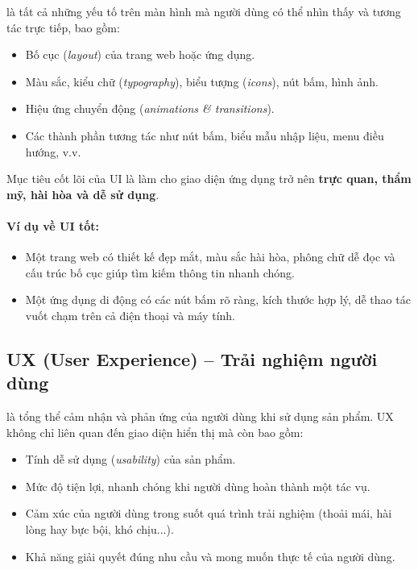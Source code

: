  là tất cả những yếu tố trên màn hình mà người dùng có thể nhìn thấy và tương tác trực tiếp, bao gồm:
\begin{itemize}[leftmargin=1.8em, itemsep=2pt, parsep=0pt]
    \item Bố cục (\textit{layout}) của trang web hoặc ứng dụng.
    \item Màu sắc, kiểu chữ (\textit{typography}), biểu tượng (\textit{icons}), nút bấm, hình ảnh.
    \item Hiệu ứng chuyển động (\textit{animations \& transitions}).
    \item Các thành phần tương tác như nút bấm, biểu mẫu nhập liệu, menu điều hướng, v.v.
\end{itemize}

\begin{tipBox}
Mục tiêu cốt lõi của UI là làm cho giao diện ứng dụng trở nên \textbf{trực quan, thẩm mỹ, hài hòa và dễ sử dụng}.
\end{tipBox}

\paragraph{Ví dụ về UI tốt:}
\begin{itemize}[leftmargin=1.8em, itemsep=2pt, parsep=0pt]
    \item Một trang web có thiết kế đẹp mắt, màu sắc hài hòa, phông chữ dễ đọc và cấu trúc bố cục giúp tìm kiếm thông tin nhanh chóng.
    \item Một ứng dụng di động có các nút bấm rõ ràng, kích thước hợp lý, dễ thao tác vuốt chạm trên cả điện thoại và máy tính.
\end{itemize}

\subsection{UX (User Experience) -- Trải nghiệm người dùng}

 là tổng thể cảm nhận và phản ứng của người dùng khi sử dụng sản phẩm. UX không chỉ liên quan đến giao diện hiển thị mà còn bao gồm:
\begin{itemize}[leftmargin=1.8em, itemsep=2pt, parsep=0pt]
    \item Tính dễ sử dụng (\textit{usability}) của sản phẩm.
    \item Mức độ tiện lợi, nhanh chóng khi người dùng hoàn thành một tác vụ.
    \item Cảm xúc của người dùng trong suốt quá trình trải nghiệm (thoải mái, hài lòng hay bực bội, khó chịu...).
    \item Khả năng giải quyết đúng nhu cầu và mong muốn thực tế của người dùng.
\end{itemize}

